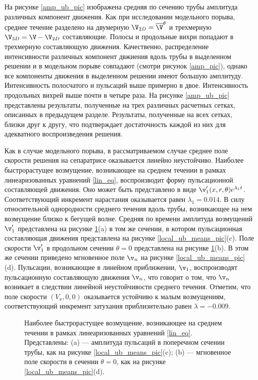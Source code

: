 На рисунке \ref{amp_ub_pic} изображена средняя по сечению трубы амплитуда различных компонент движения. Как при исследовании модельного порыва, среднее течение разделено на двумерную $\V_{2D} = \overline{\V}^{\theta}$ и трехмерную $\V_{3D} = \V - \V_{2D}$ составляющие. Полосы и продольные вихри попадают в трехмерную составляющую движения. Качественно, распределение интенсивности различных компонент двжиения вдоль трубы в выделенном решении и в модельном порыве совпадают (смотри рисунок \ref{amp_pic}), однако все компоненты движения в выделенном решении имеют большую амплитуду. Интенсивность полосчатого и пульсаций выше примерно в двое. Интенсивность продольных вихрей выше почти в четыре раза. На рисунке \ref{amp_ub_pic} представлены результаты, полученные на трех различных расчетных сетках, описанных в предыдущем разделе. Результаты, полученные на всех сетках, близки друг к другу, что подтверждает достаточность каждой из них для адекватного воспроизведения решения. 



Как в случае модельного порыва, в рассматриваемом случае среднее поле скорости решения на сепаратрисе оказывается линейно неустойчиво. Наиболее быстрорастущее возмущение, возникающее на среднем течении в рамках линеаризованных уравнений \eqref{lin_eq}, воспроизводит форму пульсационной составляющей движения. Оно может быть представлено в виде $\v'_1(x,r,\theta) e^{\lambda_1 t}$. Соответствующий инкремент нарастания оказывается равен $\lambda_1 = 0.014$. В силу относительной однородности среднего течения вдоль трубы, возникающее на нем возмущение близко к бегущей волне. Средняя по времени амплитуда возмущений $\v'_1$ представлена на рисунке \ref{ub_lin_pic}(a) в том же сечении, в котором пульсационная составляющая движения представлена на рисунке \ref{local_ub_means_pic}(c). Поле скорости $\v'_1$ в продольном сечении $\theta = 0$ представлена на рисунке \ref{ub_lin_pic}(b). В этом же сечении приведено мгновенное поле $\v_n$ на рисунке \ref{local_ub_means_pic}(d). Пульсации, возникающие в линейном приближении, $\v_1$, воспроизводят пульсационную составляющую движения $\v_n$, что говорит о том, что $\v_n$ возникает в следствии линейной неустойчивости среднего течения. Отметим, что поле скорости $(V_x, 0, 0)$ оказывается устойчиво к малым возмущениям, соответствующий инкремент затухания приблизительно равен $\lambda = -0.009$. 


\begin{figure}
\caption{Наиболее быстрорастущее возмущение, возникающее на среднем течении в рамках линеаризованных уравнений \eqref{lin_eq}. Представлены: (a) --- амплитуда пульсаций в поперечном сечении трубы, как на рисунке \ref{local_ub_means_pic}(c); (b) --- мгновенное поле скорости в сечении $\theta = 0$, как на рисунке \ref{local_ub_means_pic}(d). }
\label{ub_lin_pic}
\end{figure}

